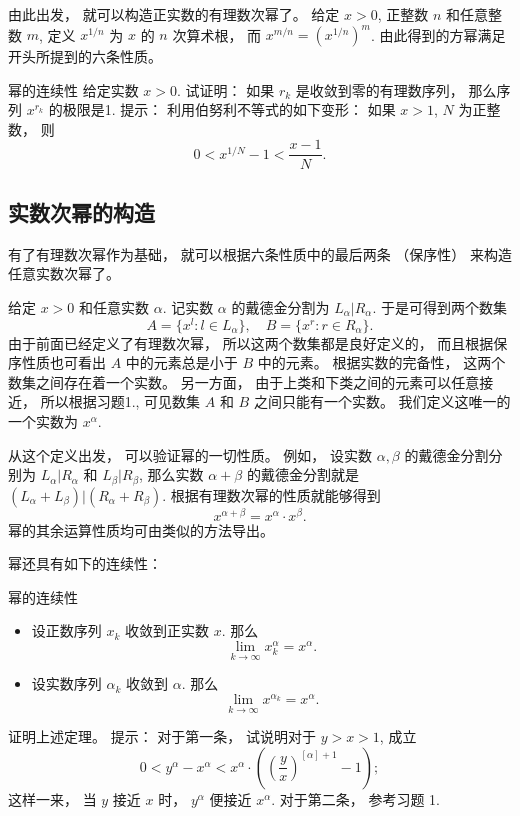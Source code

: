 由此出发， 就可以构造正实数的有理数次幂了。 给定 $x>0$, 正整数 $n$ 和任意整数 $m$, 定义 $x^{1/n}$ 为 $x$ 的 $n$ 次算术根， 而 $x^{m/n}=(x^{1/n})^m$. 由此得到的方幂满足开头所提到的六条性质。

\begin{exercise}{幂的连续性}
给定实数 $x>0$. 试证明： 如果 $r_k$ 是收敛到零的有理数序列， 那么序列 $x^{r_k}$ 的极限是1. 提示： 利用伯努利不等式的如下变形： 如果 $x>1$, $N$ 为正整数， 则
\[
0<x^{1/N}-1<\frac{x-1}{N}.
\]
\end{exercise}

\subsection{实数次幂的构造}
有了有理数次幂作为基础， 就可以根据六条性质中的最后两条 （保序性） 来构造任意实数次幂了。 

给定 $x>0$ 和任意实数 $\alpha$. 记实数 $\alpha$ 的戴德金分割为 $L_\alpha|R_\alpha$. 于是可得到两个数集
\[
A=\{x^l:l\in L_\alpha\},\quad B=\{x^r:r\in R_\alpha\}.
\]
由于前面已经定义了有理数次幂， 所以这两个数集都是良好定义的， 而且根据保序性质也可看出 $A$ 中的元素总是小于 $B$ 中的元素。 根据实数的完备性， 这两个数集之间存在着一个实数。 另一方面， 由于上类和下类之间的元素可以任意接近， 所以根据习题1., 可见数集 $A$ 和 $B$ 之间只能有一个实数。 我们定义这唯一的一个实数为 $x^\alpha$.

从这个定义出发， 可以验证幂的一切性质。 例如， 设实数 $\alpha,\beta$ 的戴德金分割分别为 $L_\alpha|R_\alpha$ 和 $L_\beta|R_\beta$, 那么实数 $\alpha+\beta$ 的戴德金分割就是 $(L_\alpha+L_\beta)|(R_\alpha+R_\beta)$. 根据有理数次幂的性质就能够得到
\[
x^{\alpha+\beta}=x^\alpha\cdot x^\beta.
\]
幂的其余运算性质均可由类似的方法导出。

幂还具有如下的连续性：

\begin{theorem}{幂的连续性}
\begin{itemize}
\item 设正数序列 $x_k$ 收敛到正实数 $x$. 那么
\[
\lim_{k\to\infty}x_k^\alpha=x^\alpha.
\]
\item 设实数序列 $\alpha_k$ 收敛到 $\alpha$. 那么
\[
\lim_{k\to\infty}x^{\alpha_k}=x^\alpha.
\]
\end{itemize}
\end{theorem}

\begin{exercise}{}
证明上述定理。 提示： 对于第一条， 试说明对于 $y>x>1$, 成立
\[
0<y^\alpha-x^\alpha<x^\alpha\cdot\left(\left(\frac{y}{x}\right)^{[\alpha]+1}-1\right);
\]
这样一来， 当 $y$ 接近 $x$ 时， $y^\alpha$ 便接近 $x^\alpha$. 对于第二条， 参考习题 1.
\end{exercise}

